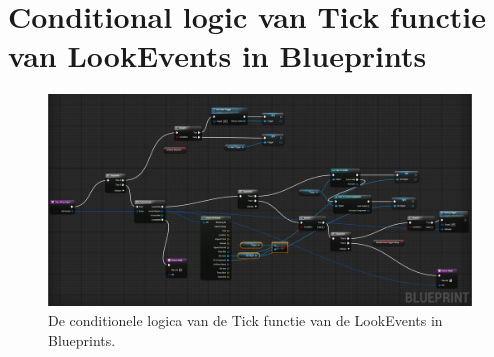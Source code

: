\chapter{Conditional logic van Tick functie van LookEvents in Blueprints}
\lhead{}
\label{appendix:LookEventsLogicBlueprints}

\begin{figure}[!ht]
  \centering
    \includegraphics[width=\linewidth,height=\textheight,keepaspectratio]{Figures/WasHitBytTraceBluePrintExample.png}
    \caption{De conditionele logica van de Tick functie van de LookEvents in Blueprints.}
\end{figure}